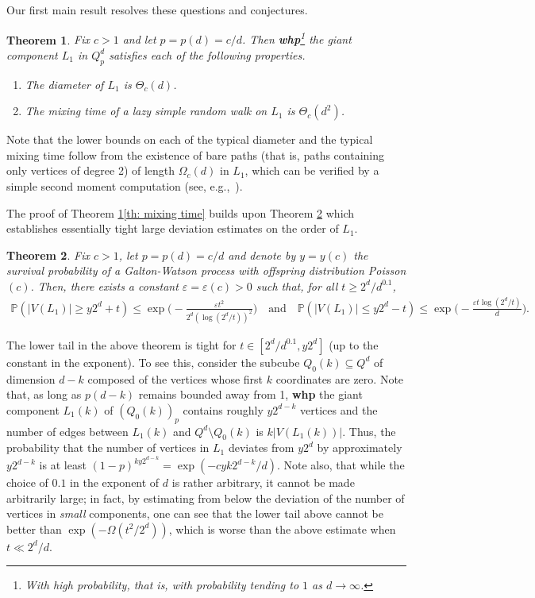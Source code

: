 \documentclass[reqno,final,a4paper]{amsart}
\newtheorem{theorem}{Theorem}
\theoremstyle{definition}
\newcommand{\whp}{%
    \textbf{whp}
}
\def\eps{\varepsilon}
\newcommand{\1}{\mathbbm{1}}
\begin{document}
Our first main result resolves these questions and conjectures.
\begin{theorem}\label{th: main}
Fix $c > 1$ and let $p=p(d)=c/d$. Then \textbf{whp}\footnote{With high probability, that is, with probability tending to $1$ as $d\to \infty$.} the giant component $L_1$ in $Q^d_p$ satisfies each of the following properties.
\begin{enumerate}[label=\upshape(\alph*)]
    \item The diameter of $L_1$ is $\Theta_c(d)$.\label{th: diameter}
    \item The mixing time of a lazy simple random walk on $L_1$ is $\Theta_c(d^2)$.\label{th: mixing time}
\end{enumerate}
\end{theorem}
Note that the lower bounds on each of the typical diameter and the typical mixing time follow from the existence of bare paths (that is, paths containing only vertices of degree 2) of length $\Omega_c(d)$ in $L_1$, which can be verified by a simple second moment computation (see, e.g.,~\cite[Section 5]{EKK22}).

The proof of Theorem \ref{th: main}\ref{th: mixing time} builds upon Theorem \ref{th: large tail deviation} which establishes essentially tight large deviation estimates on the order of $L_1$.
\begin{theorem}\label{th: large tail deviation}
Fix $c>1$, let $p=p(d)=c/d$ and denote by $y=y(c)$ the survival probability of a Galton-Watson process with offspring distribution Poisson$(c)$.
Then, there exists a constant $\eps=\eps(c)>0$ such that, for all $t\ge 2^d/d^{0.1}$,
\begin{align*}
\mathbb{P}(|V(L_1)|\ge y2^d+t)\le \exp\bigg(-\frac{\eps t^2}{2^d (\log(2^d/t))^2}\bigg) \quad \text{and}\quad \mathbb{P}(|V(L_1)|\le y2^d-t)\le \exp\bigg(-\frac{\eps t\log(2^d/t)}{d}\bigg).
\end{align*}
\end{theorem}

The lower tail in the above theorem is tight for $t\in [2^d/d^{0.1}, y2^d]$ (up to the constant in the exponent). To see this, consider the subcube $Q_0(k)\subseteq Q^d$ of dimension $d-k$ composed of the vertices whose first $k$ coordinates are zero. 
Note that, as long as $p(d-k)$ remains bounded away from 1, \whp the giant component $L_1(k)$ of $(Q_0(k))_p$ contains roughly $y2^{d-k}$ vertices and the number of edges between $L_1(k)$ and $Q^d\setminus Q_0(k)$ is $k|V(L_1(k))|$.
Thus, the probability that the number of vertices in $L_1$ deviates from $y2^d$ by approximately $y2^{d-k}$ is at least $(1-p)^{ky2^{d-k}} = \exp(-cyk2^{d-k}/d)$. Note also, that while the choice of $0.1$ in the exponent of $d$ is rather arbitrary, it cannot be made arbitrarily large; in fact, by estimating from below the deviation of the number of vertices in \textit{small} components, one can see that the lower tail above cannot be better than $\exp\left(-\Omega(t^2/2^d)\right)$, which is worse than the above estimate when $t\ll 2^d/d$.
\end{document}
